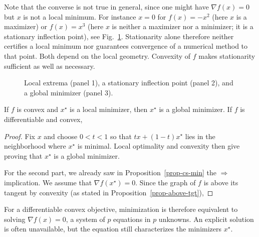 Note that the converse is not true in general, since one might have $\nabla f(x)=0$ but $x$ is not a local minimum. For instance $x=0$ for $f(x)=-x^2$ (here $x$ is a maximizer) or $f(x)=x^3$ (here $x$ is neither a maximizer nor a minimizer; it is a stationary inflection point), see Fig.~\ref{fig-first-order}.
%
Stationarity alone therefore neither certifies a local minimum nor guarantees convergence of a numerical method to that point. Both depend on the local geometry.
%
Convexity of $f$ makes stationarity sufficient as well as necessary.

\begin{figure}[tbp]
\centering
{}\hfill
{}\hfill
{}
\caption{Local extrema (panel 1), a stationary inflection point (panel 2), and a global minimizer (panel 3).}
\label{fig-first-order}
\end{figure}


\begin{prop} 
If $f$ is convex and $x^\star$ is a local minimizer, then $x^\star$ is a global minimizer.
If $f$ is differentiable and convex, 
\end{prop}
\begin{proof}
Fix $x$ and choose $0<t<1$ so that $tx+(1-t)x^\star$ lies in the neighborhood where $x^\star$ is minimal. Local optimality and convexity then give
proving that $x^\star$ is a global minimizer.

For the second part, we already saw in Proposition~\ref{prop-cs-min} the $\Rightarrow$ implication. We assume that $\nabla f(x^\star)=0$. Since the graph of $f$ is above its tangent by convexity (as stated in Proposition~\ref{prop-above-tgt}),
\end{proof}

For a differentiable convex objective, minimization is therefore equivalent to solving $\nabla f(x)=0$, a system of $p$ equations in $p$ unknowns.
%
An explicit solution is often unavailable, but the equation still characterizes the minimizers $x^\star$.



